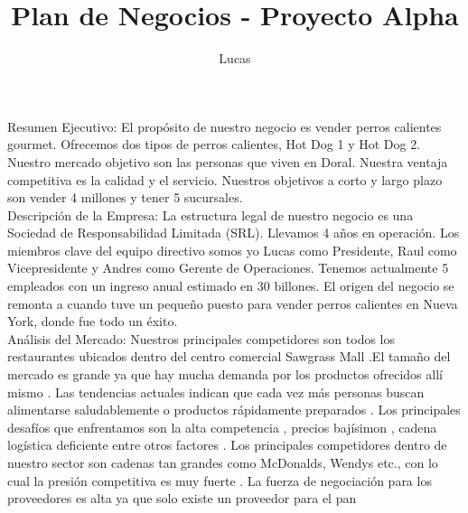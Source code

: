 \documentclass[a4paper,12pt]{article}
\title{\textbf{Plan de Negocios - Proyecto Alpha}}
\author{Lucas }
\begin{document}
 

 \maketitle 

 Resumen Ejecutivo: El propósito de nuestro negocio es vender perros calientes gourmet. Ofrecemos dos tipos de perros calientes, Hot Dog 1 y Hot Dog 2. Nuestro mercado objetivo son las personas que viven en Doral. Nuestra ventaja competitiva es la calidad y el servicio. Nuestros objetivos a corto y largo plazo son vender 4 millones y tener 5 sucursales.\\

 Descripción de la Empresa: La estructura legal de nuestro negocio es una Sociedad de Responsabilidad Limitada (SRL). Llevamos 4 años en operación. Los miembros clave del equipo directivo somos yo Lucas como Presidente, Raul como Vicepresidente y Andres como Gerente de Operaciones. Tenemos actualmente 5 empleados con un ingreso anual estimado en 30 billones. El origen del negocio se remonta a cuando tuve un pequeño puesto para vender perros calientes en Nueva York, donde fue todo un éxito. \\  
    Análisis del Mercado: Nuestros principales competidores son todos los restaurantes ubicados dentro del centro comercial Sawgrass Mall .El tamaño del mercado es grande ya que hay mucha demanda por los productos ofrecidos allí mismo . Las tendencias actuales indican que cada vez más personas buscan alimentarse saludablemente o productos rápidamente preparados . Los principales desafíos que enfrentamos son la alta competencia , precios bajísimon , cadena logística deficiente entre otros factores . Los principales competidores dentro de nuestro sector son cadenas tan grandes como McDonalds, Wendys etc., con lo cual la presión competitiva es muy fuerte . La fuerza de negociación para los proveedores es alta ya que solo existe un proveedor para el pan
\end{document}
